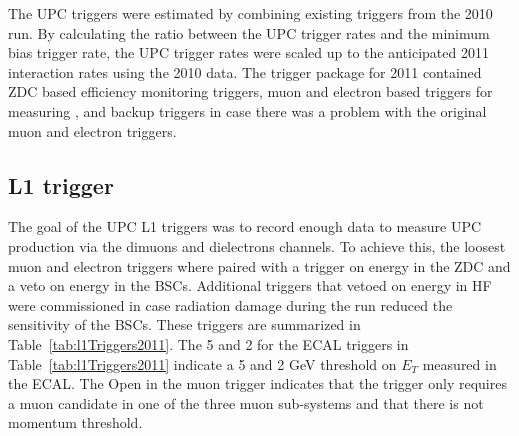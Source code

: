     The UPC triggers were estimated by combining existing triggers from
      the 2010 run. 
    By calculating the ratio between the UPC trigger rates and the minimum bias
      trigger rate, the UPC trigger rates were scaled up to the anticipated 2011 
      interaction rates using the 2010 data.
    The trigger package for 2011 contained ZDC based efficiency monitoring 
      triggers, muon and electron based triggers for measuring \JPsi{}, and 
      backup triggers in case there was a problem with the original muon and 
      electron triggers.

    \subsection{\label{sec:l1Trigger} L1 trigger}
      The goal of the UPC L1 triggers was to record enough data to measure 
        UPC \JPsi production via the dimuons and dielectrons channels.
      To achieve this, the loosest muon and electron triggers where paired with
        a trigger on energy in the ZDC and a veto on energy in the BSCs.
      Additional triggers that vetoed on energy in HF were commissioned in case
        radiation damage during the run reduced the sensitivity of the BSCs.
      These triggers are summarized in Table~\ref{tab:l1Triggers2011}.
      The 5 and 2 for the ECAL triggers in Table~\ref{tab:l1Triggers2011}
        indicate a 5 and 2 GeV threshold on $E_{T}$ measured in the ECAL.
      The Open in the muon trigger indicates that the trigger only 
        requires a muon candidate in one of the three muon sub-systems and that
        there is not momentum threshold.

